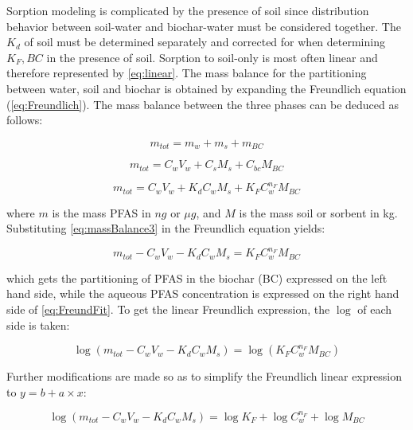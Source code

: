 Sorption modeling is complicated by the presence of soil since distribution behavior between soil-water and biochar-water must be considered together. The $K_d$ of soil must be determined separately and corrected for when determining $K_F,BC$ in the presence of soil. Sorption to soil-only is most often linear and therefore represented by \cref{eq:linear}. The mass balance for the partitioning between water, soil and biochar is obtained by expanding the Freundlich equation (\cref{eq:Freundlich}). The mass balance between the three phases can be deduced as follows:

\begin{equation} \label{eq:massBalance1}
    m_{tot} = m_{w} + m_{s} + m_{BC}
\end{equation}

\begin{equation} \label{eq:massBalance2}
     m_{tot} = C_{w}V_{w} + C_sM_s + C_{bc}M_{BC}
\end{equation}

\begin{equation} \label{eq:massBalance3}
     m_{tot} = C_{w}V_{w} + K_dC_{w}M_s + K_{F}C_{w}^{n_F}M_{BC}
\end{equation}
 
where $m$ is the mass PFAS in $ng$ or $\mu g$, and $M$ is the mass soil or sorbent in kg. Substituting \cref{eq:massBalance3} in the Freundlich equation yields:

\begin{equation} \label{eq:FreundFit}
    m_{tot} - C_{w}V_{w} - K_dC_{w}M_s = K_{F}C_{w}^{n_F}M_{BC}
\end{equation}

which gets the partitioning of PFAS in the biochar (BC) expressed on the left hand side, while the aqueous PFAS concentration is expressed on the right hand side of \cref{eq:FreundFit}. To get the linear Freundlich expression, the $\log$ of each side is taken:

\begin{equation} \label{eq:FreundLinSoil1}
   \log (m_{tot} - C_{w}V_{w} - K_dC_{w}M_s) = \log (K_{F}C_{w}^{n_F}M_{BC})
\end{equation}

Further modifications are made so as to simplify the Freundlich linear expression to $y = b + a \times x$:

\begin{equation} \label{eq:FreundLinSoil2}
    \log (m_{tot} - C_{w}V_{w} - K_dC_{w}M_s) = \log K_{F} + \log C_{w}^{n_F} + \log M_{BC}
\end{equation}

